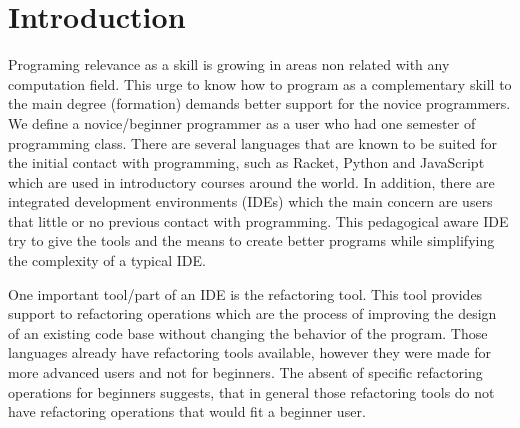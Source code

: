 \section{Introduction}




Programing relevance as a skill is growing in areas non related with any computation field.  %
This urge to know how to program as a complementary skill %
to the main degree (formation) demands better support for the novice programmers.
We define a novice/beginner programmer as a user who had one semester of programming class. %
There are several languages that are known to be suited for the initial contact %
with programming, such as Racket, Python and JavaScript which are used in introductory
courses around the world.
In addition, there are integrated development environments (IDEs) which the main
concern are users that little or no previous contact with programming.
This pedagogical %
aware IDE try to give the tools and the means to create better programs while simplifying
the complexity of a typical IDE. %

One important tool/part of an IDE is the refactoring tool. This tool provides
support to refactoring operations which are the process of improving the design
of an existing code base \cite{fowler1999refactoring}
without changing the behavior of the program.
Those languages already have refactoring tools available, %
however they were made for more advanced users and not for beginners.
The absent of specific refactoring operations for beginners suggests, that in general %
those refactoring tools do not have refactoring operations that
would fit a beginner user.

